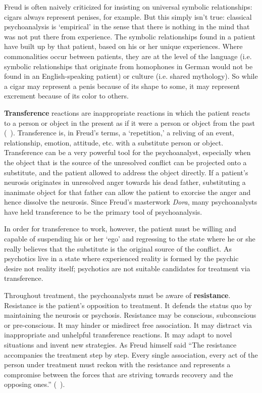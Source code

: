 \begin{refsection}
Freud is often naively criticized for insisting on universal symbolic relationships: cigars always represent penises, for example. But this simply isn't true: classical psychoanalysis is `empirical' in the sense that there is nothing in the mind that was not put there from experience. The symbolic relationships found in a patient have built up by that patient, based on his or her unique experiences. Where commonalities occur between patients, they are at the level of the language (i.e. symbolic relationships that originate from homophones in German would not be found in an English-speaking patient) or culture (i.e. shared mythology). So while a cigar may represent a penis because of its shape to some, it may represent excrement because of its color to others.

\textbf{Transference} reactions are inappropriate reactions in which the patient reacts to a person or object in the present as if it were a person or object from the past (~\citep[Ch. 27]{Freud:QdOvAgyZ}). Transference is, in Freud's terms, a `repetition,' a reliving of an event, relationship, emotion, attitude, etc. with a substitute person or object. Transference can be a very powerful tool for the psychoanalyst, especially when the object that is the source of the unresolved conflict can be projected onto a substitute, and the patient allowed to address the object directly. If a patient's neurosis originates in unresolved anger towards his dead father, substituting a inanimate object for that father can allow the patient to exorcise the anger and hence dissolve the neurosis. Since Freud's masterwork \emph{Dora}, many psychoanalysts have held transference to be the primary tool of psychoanalysis.

In order for transference to work, however, the patient must be willing and capable of suspending his or her `ego' and regressing to the state where he or she really believes that the substitute is the original source of the conflict. As psychotics live in a state where experienced reality is formed by the psychic desire not reality itself; psychotics are not suitable candidates for treatment via transference.

Throughout treatment, the psychoanalysts must be aware of \textbf{resistance}. Resistance is the patient's opposition to treatment. It defends the status quo by maintaining the neurosis or psychosis. Resistance may be conscious, subconscious or pre-conscious. It may hinder or misdirect free association. It may distract via inappropriate and unhelpful transference reactions. It may adapt to novel situations and invent new strategies. As Freud himself said “The resistance accompanies the treatment step by step. Every single association, every act of the person under treatment must reckon with the resistance and represents a compromise between the forces that are striving towards recovery and the opposing ones.” (~\citep[p. 11]{Psychology:pHtNxV6R}).


\end{refsection}
